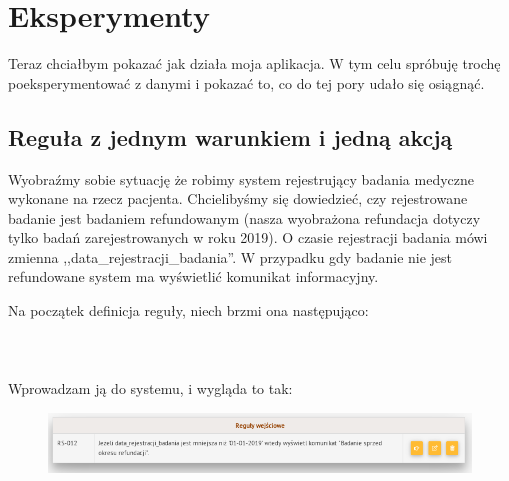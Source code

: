\section{Eksperymenty}
Teraz chciałbym pokazać jak działa moja aplikacja. W tym celu spróbuję trochę poeksperymentować z danymi i pokazać to, co do tej pory udało się osiągnąć.

\subsection{Reguła z jednym warunkiem i jedną akcją}
Wyobraźmy sobie sytuację że robimy system rejestrujący badania medyczne wykonane na rzecz pacjenta. Chcielibyśmy się dowiedzieć, czy rejestrowane badanie jest badaniem refundowanym (nasza wyobrażona refundacja dotyczy tylko badań zarejestrowanych w roku 2019). O czasie rejestracji badania mówi zmienna ,,data\_rejestracji\_badania''. W przypadku gdy badanie nie jest refundowane system ma wyświetlić komunikat informacyjny. 

Na początek definicja reguły, niech brzmi ona następująco:
\\ \\
\\ \\
Wprowadzam ją do systemu, i wygląda to tak:
\begin{figure}[H]
	\centering
	\includegraphics[scale=0.8]{img/app-eksperymenty/p1-1.png}
\end{figure}

